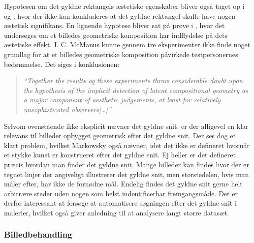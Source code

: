 {Hypotesen om det gyldne rektangels æstetiske egenskaber bliver også
taget op i \cite{Boselie1984} og \cite{Plug1980}, hvor der ikke kan
konkluderes at det gyldne rektangel skulle have nogen æstetisk
signifikans. En lignende hypotese bliver sat på prøve i
\cite{McManus1995}, hvor det undersøges om et billedes geometriske
komposition har indflydelse på dets æstetiske effekt. I. C. McManus
kunne gennem tre eksperimenter ikke finde noget grundlag for at et
billedes geometriske komposition påvirkede testpersonernes bedømmelse.
Det siges i konklusionen:

\begin{quote}
	\emph{``Together the results og these experiments throw
	considerable doubt upon the hypothesis of the implicit detection
	of latent compositional geometry as a major component of
	aesthetic judgements, at least for relatively unsophisticated
	observers[\dots]''}
\end{quote}

Selvom ovenstående ikke eksplicit nævner det gyldne snit, er der
alligevel en klar relevans til billeder opbygget geometrisk efter det
gyldne snit. Der ses dog et klart problem, hvilket Markowsky også
nævner, idet det ikke er defineret hvornår et stykke kunst er
konstrueret efter det gyldne snit. Ej heller er det defineret præcis
hvordan man finder det gyldne snit. Mange billeder kan findes hvor der
er tegnet linjer der angiveligt illustrerer det gyldne snit, men
størstedelen, hvis man måler efter, har ikke de fornødne mål. Endelig
findes det gyldne snit gerne helt arbitrære steder uden nogen som helst
indentificerbar fremgangsmåde. Det er derfor interessant at forsøge at
automatisere søgningen efter det gyldne snit i malerier, hvilket også
giver anledning til at analysere langt større datasæt.

\subsubsection{Billedbehandling}
}

